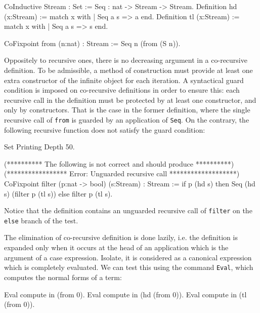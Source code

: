 \begin{coq_example*}
CoInductive Stream : Set :=
    Seq : nat -> Stream -> Stream.
Definition hd (x:Stream) := match x with
                            | Seq a s => a
                            end.
Definition tl (x:Stream) := match x with
                            | Seq a s => s
                            end.
\end{coq_example*}
\begin{coq_example}
CoFixpoint from (n:nat) : Stream := Seq n (from (S n)).
\end{coq_example}

Oppositely to recursive ones, there is no decreasing argument in a
co-recursive definition. To be admissible, a method of construction
must provide at least one extra constructor of the infinite object for
each iteration. A syntactical guard condition is imposed on
co-recursive definitions in order to ensure this: each recursive call
in the definition must be protected by at least one constructor, and
only by constructors. That is the case in the former definition, where
the single recursive call of \texttt{from} is guarded by an
application of \texttt{Seq}. On the contrary, the following recursive
function does not satisfy the guard condition:

\begin{coq_eval}
Set Printing Depth 50.
\end{coq_eval}
\begin{coq_example*}
(********** The following is not correct and should produce **********)
(***************** Error: Unguarded recursive call *******************)
CoFixpoint filter (p:nat -> bool) (s:Stream) : Stream :=
  if p (hd s) then Seq (hd s) (filter p (tl s)) else filter p (tl s).
\end{coq_example*}

\noindent Notice that the definition contains an unguarded recursive
call of \texttt{filter} on the \texttt{else} branch of the test.

The elimination of co-recursive definition is done lazily, i.e. the
definition is expanded only when it occurs at the head of an
application which is the argument of a case expression.  Isolate, it
is considered as a canonical expression which is completely
evaluated. We can test this using the command \texttt{Eval},
which computes the normal forms of a term:

\begin{coq_example}
Eval compute in (from 0).
Eval compute in (hd (from 0)).
Eval compute in (tl (from 0)).
\end{coq_example}

